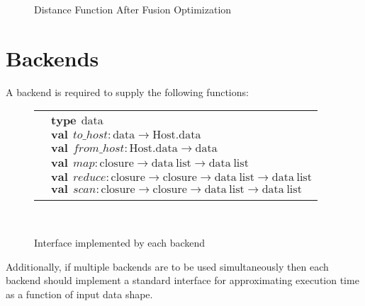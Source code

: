 \documentclass[preprint]{sigplanconf}
\begin{document}
\begin{figure}[h!]

\caption{Distance Function After Fusion Optimization}
\label{DistFuse}
\end{figure}


\section{Backends} 
A backend is required to supply the following functions: 
\begin{figure}[h!]
\begin{tabular}{| m{0.001cm}m{7.8cm} |}
 \hline 
& \\[0.1pt]
& $\mathbf{type} ~~ \mathrm{data}$   \\[3pt]
& $\mathbf{val} ~~ \mathit{to\_host}  : \mathrm{data} \rightarrow  \mathrm{Host.data}$ \\
& $\mathbf{val} ~~ \mathit{from\_host}  : \mathrm{Host.data}  \rightarrow \mathrm{data}$ \\[3pt]
& $\mathbf{val} ~~ \mathit{map}  : \mathrm{closure}  \rightarrow \mathrm{data ~ list}  \rightarrow \mathrm{data~ list} $ \\
& $\mathbf{val} ~~ \mathit{reduce}  : \mathrm{closure}  \rightarrow \mathrm{closure}  \rightarrow \mathrm{data~ list}  \rightarrow \mathrm{data ~ list}$ \\ 
& $\mathbf{val} ~~ \mathit{scan}  : \mathrm{closure}  \rightarrow \mathrm{closure}  \rightarrow  \mathrm{data  ~ list}  \rightarrow \mathrm{data ~ list}$ \\
& \\
 \hline
\end{tabular}\\[4pt]
\caption{Interface implemented by each backend}
\end{figure}

Additionally, if multiple backends are to be used simultaneously then each backend should implement a standard interface for approximating
execution time as a function of input data shape. 


{}
\end{document}
